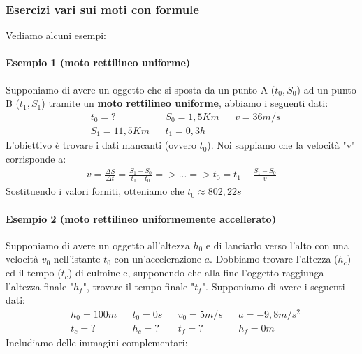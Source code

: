 		\subsubsection{Esercizi vari sui moti con formule}
			Vediamo alcuni esempi:
			\paragraph{Esempio 1 (moto rettilineo uniforme)}
				Supponiamo di avere un oggetto che si sposta da un punto A ($t_0, S_0$) ad un punto B ($t_1, S_1$) tramite un \textbf{moto rettilineo uniforme}, abbiamo i seguenti dati:
				\begin{align*}
					&t_0 = ?&&S_0=1,5Km&&v=36m/s\\
					&S_1 = 11,5Km&&t_1=0,3h
				\end{align*}
				L'obiettivo è trovare i dati mancanti (ovvero $t_0$). Noi sappiamo che la velocità "v" corrisponde a:
				\begin{align*}
					v=\frac{\Delta S}{\Delta t}=\frac{S_1-S_0}{t_1-t_0}=> ... => t_0 = t_1 -\frac{S_1-S_0}{v}
				\end{align*}
				Sostituendo i valori forniti, otteniamo che $t_0 \approx 802,22s$

			\paragraph{Esempio 2 (moto rettilineo uniformemente accellerato)}
				Supponiamo di avere un oggetto all'altezza $h_0$ e di lanciarlo verso l'alto con una velocità $v_0$ nell'istante $t_0$ con un'accelerazione $a$. Dobbiamo trovare l'altezza ($h_c$) ed il tempo ($t_c$) di culmine e, supponendo che alla fine l'oggetto raggiunga l'altezza finale "$h_f$", trovare il tempo finale "$t_f$". Supponiamo di avere i seguenti dati:
				\begin{align*}
					&h_0 = 100m&&t_0=0s&&v_0=5m/s&&a=-9,8m/s^2\\
					&t_c = ? && h_c=? && t_f = ? && h_f = 0m
				\end{align*}
				Includiamo delle immagini complementari:

